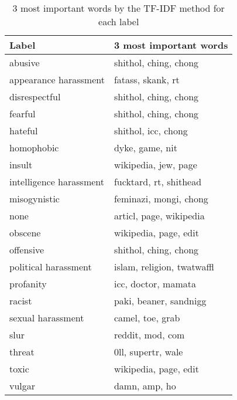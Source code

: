 \documentclass[fleqn,moreauthors,10pt]{ds_report}
\begin{document}
\begin{table}[]
    \centering
    \begin{tabular}{ll}
        \toprule
                      Label &                        3 most important words \\
        \midrule
                        abusive &      shithol, ching, chong \\
         appearance harassment &          fatass, skank, rt \\
                  disrespectful &      shithol, ching, chong \\
                        fearful &      shithol, ching, chong \\
                        hateful &        shithol, icc, chong \\
                     homophobic &            dyke, game, nit \\
                         insult &       wikipedia, jew, page \\
       intelligence harassment &     fucktard, rt, shithead \\
                   misogynistic &     feminazi, mongi, chong \\
                           none &    articl, page, wikipedia \\
                        obscene &      wikipedia, page, edit \\
                      offensive &      shithol, ching, chong \\
          political harassment & islam, religion, twatwaffl \\
                      profanity &        icc, doctor, mamata \\
                         racist &     paki, beaner, sandnigg \\
             sexual harassment &           camel, toe, grab \\
                           slur &           reddit, mod, com \\
                         threat &         0ll, supertr, wale \\
                          toxic &      wikipedia, page, edit \\
                         vulgar &              damn, amp, ho \\
        \bottomrule
        \end{tabular}
    \label{tab:tf_idf}
    \caption{3 most important words by the TF-IDF method for each label}
\end{table}
\end{document}
